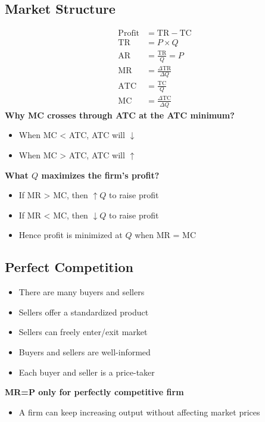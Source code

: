 \documentclass{article}
\begin{document}
\begin{multicols}{2}
\section{Market Structure}
\begin{equation*}
	\begin{aligned}
		\text{Profit} &= \text{TR} - \text{TC}\\
		\text{TR} &= P \times Q \\
		\text{AR} &= \frac{\text{TR}}{Q} = P\\
		\text{MR} &= \frac{\Delta \text{TR}}{\Delta Q}\\
		\text{ATC} &= \frac{\text{TC}}{Q}\\
		\text{MC} &= \frac{\Delta \text{TC}}{\Delta Q}
	\end{aligned}
\end{equation*}
\textbf{Why MC crosses through ATC at the ATC minimum?}
\begin{itemize}
	\item When MC < ATC, ATC will $\downarrow$
	\item When MC > ATC, ATC will $\uparrow$
\end{itemize}
\textbf{What $Q$ maximizes the firm's profit?}
\begin{itemize}
	\item If MR > MC, then $\uparrow Q$ to raise profit
	\item If MR < MC, then $\downarrow Q$ to raise profit
	\item Hence profit is minimized at $Q$ when MR = MC
\end{itemize}

\subsection{Perfect Competition}
\begin{itemize}
	\item There are many buyers and sellers
	\item Sellers offer a standardized product
	\item Sellers can freely enter/exit market
	\item Buyers and sellers are well-informed
	\item Each buyer and seller is a price-taker
\end{itemize}
\textbf{MR=P only for perfectly competitive firm}
\begin{itemize}
	\item A firm can keep increasing output without affecting market prices
\end{itemize}
\end{multicols}
\end{document}
